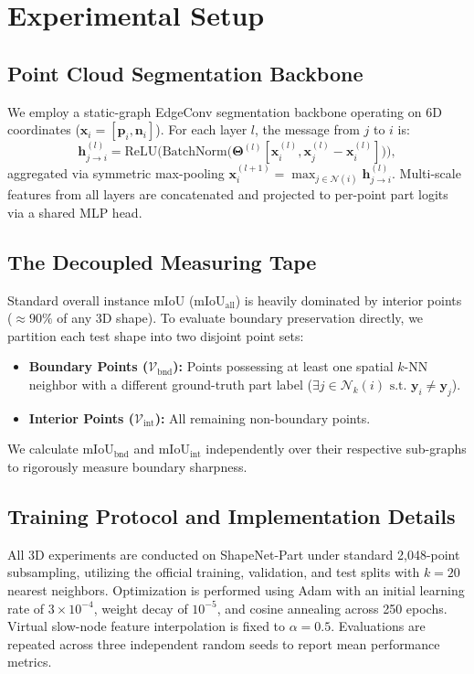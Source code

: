 \documentclass[journal]{IEEEtran}
\begin{document}
\section{Experimental Setup}

\subsection{Point Cloud Segmentation Backbone}
We employ a static-graph EdgeConv segmentation backbone \cite{dgcnn} operating on 6D coordinates ($\mathbf{x}_i = [\mathbf{p}_i, \mathbf{n}_i]$). For each layer $l$, the message from $j$ to $i$ is:
\begin{equation}
\mathbf{h}_{j \to i}^{(l)} = \text{ReLU}\Big(\text{BatchNorm}\big(\mathbf{\Theta}^{(l)} [\mathbf{x}_i^{(l)}, \mathbf{x}_j^{(l)} - \mathbf{x}_i^{(l)}]\big)\Big),
\end{equation}
aggregated via symmetric max-pooling $\mathbf{x}_i^{(l+1)} = \max_{j \in \mathcal{N}(i)} \mathbf{h}_{j \to i}^{(l)}$. Multi-scale features from all layers are concatenated and projected to per-point part logits via a shared MLP head.

\subsection{The Decoupled Measuring Tape}
Standard overall instance mIoU ($\text{mIoU}_{\text{all}}$) is heavily dominated by interior points ($\approx 90\%$ of any 3D shape). To evaluate boundary preservation directly, we partition each test shape into two disjoint point sets:
\begin{itemize}
    \item \textbf{Boundary Points ($\mathcal{V}_{\text{bnd}}$):} Points possessing at least one spatial $k$-NN neighbor with a different ground-truth part label ($\exists j \in \mathcal{N}_k(i) \text{ s.t. } \mathbf{y}_i \neq \mathbf{y}_j$).
    \item \textbf{Interior Points ($\mathcal{V}_{\text{int}}$):} All remaining non-boundary points.
\end{itemize}
We calculate $\text{mIoU}_{\text{bnd}}$ and $\text{mIoU}_{\text{int}}$ independently over their respective sub-graphs to rigorously measure boundary sharpness.

\subsection{Training Protocol and Implementation Details}
All 3D experiments are conducted on ShapeNet-Part \cite{shapenet, yi2016} under standard 2,048-point subsampling, utilizing the official training, validation, and test splits with $k = 20$ nearest neighbors. Optimization is performed using Adam with an initial learning rate of $3 \times 10^{-4}$, weight decay of $10^{-5}$, and cosine annealing across 250 epochs. Virtual slow-node feature interpolation is fixed to $\alpha = 0.5$. Evaluations are repeated across three independent random seeds to report mean performance metrics.
\end{document}
